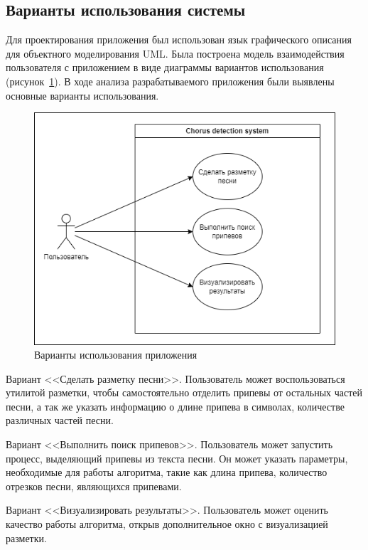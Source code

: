 \subsection{Варианты использования системы}
Для проектирования приложения был использован язык графического
описания для объектного моделирования UML. Была построена модель взаимодействия пользователя с приложением в виде диаграммы вариантов использования (рисунок~\ref{fig:Варианты использования}). 
В ходе анализа разрабатываемого приложения были выявлены основные варианты использования.
\begin{figure}[h]
    \centering
    \includegraphics[width=1\linewidth]{pictures/Варианты использования.png}
    \caption{Варианты использования приложения}
    \label{fig:Варианты использования}
\end{figure}

\begin{enumerateparen}
    \item Вариант <<Сделать разметку песни>>. Пользователь может воспользоваться утилитой разметки, чтобы самостоятельно отделить припевы от остальных частей песни, а так же указать информацию о длине припева в символах, количестве различных частей песни.
    \item Вариант <<Выполнить поиск припевов>>. Пользователь может запустить процесс, выделяющий припевы из текста песни. Он может указать параметры, необходимые для работы алгоритма, такие как длина припева, количество отрезков песни, являющихся припевами.
    \item Вариант <<Визуализировать результаты>>. Пользователь может оценить качество работы алгоритма, открыв дополнительное окно с визуализацией разметки. 
\end{enumerateparen}

